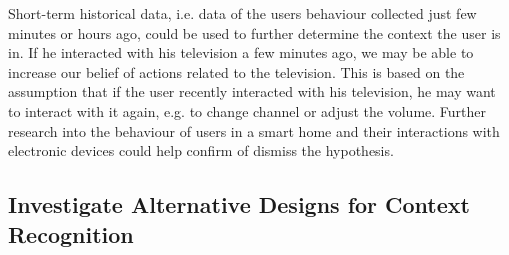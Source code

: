 Short-term historical data, i.e. data of the users behaviour collected just few minutes or hours ago, could be used to further determine the context the user is in. If he interacted with his television a few minutes ago, we may be able to increase our belief of actions related to the television. This is based on the assumption that if the user recently interacted with his television, he may want to interact with it again, e.g. to change channel or adjust the volume. Further research into the behaviour of users in a smart home and their interactions with electronic devices could help confirm of dismiss the hypothesis.

\subsection{Investigate Alternative Designs for Context Recognition}




